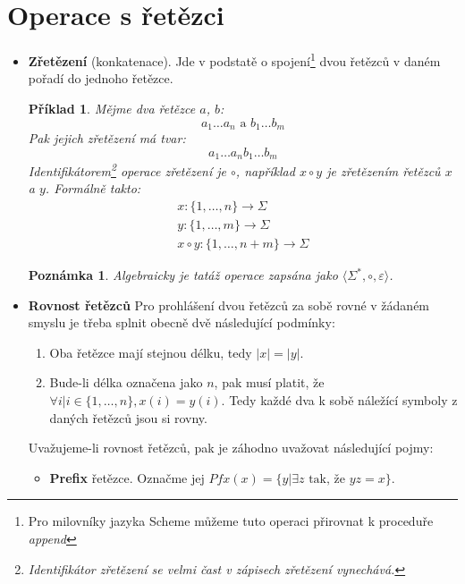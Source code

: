 \documentclass[10pt, a4paper, titlepage]{article}
\theoremstyle{note}
\newtheorem{priklad}{Příklad}
\newtheorem{poznamka}{Poznámka}
\begin{document}
\section{Operace s řetězci}
\begin{itemize}
\item
\textbf{Zřetězení} (konkatenace). Jde v podstatě o spojení\footnote{Pro milovníky jazyka Scheme můžeme tuto operaci přirovnat k proceduře \emph{append}}
dvou řetězců v daném pořadí do jednoho řetězce.

\begin{priklad}
Mějme dva řetězce $a$, $b$:
$$
a_{1}\ldots a_{n} \text{ a } b_{1}\ldots b_{m}
$$
Pak jejich zřetězení má tvar:
$$
a_{1}\ldots a_{n}b_{1}\ldots b_{m}
$$
Identifikátorem\footnote{Identifikátor zřetězení se velmi čast v zápisech zřetězení vynechává.} operace
zřetězení je $\circ$, například $x\circ y$ je zřetězením řetězců $x$ a $y$.
Formálně takto:
\begin{gather*}
x : \lbrace 1,\ldots, n \rbrace \rightarrow \Sigma \\
y : \lbrace 1,\ldots, m \rbrace \rightarrow \Sigma \\
x \circ y : \lbrace 1,\ldots, n+m \rbrace \rightarrow \Sigma
\end{gather*}
\end{priklad}

\begin{poznamka}
Algebraicky je tatáž operace zapsána jako $\langle \Sigma^{*}, \circ, \varepsilon \rangle$.
\end{poznamka}

\item
\textbf{Rovnost řetězců}
Pro prohlášení dvou řetězců za sobě rovné v žádaném smyslu je třeba splnit obecně dvě následující podmínky:
\begin{enumerate}
\item
Oba řetězce mají stejnou délku, tedy $|x| = |y|$.

\item
Bude-li délka označena jako $n$, pak musí platit, že $\forall i | i \in \lbrace 1, \ldots, n \rbrace, x(i) = y(i)$.
Tedy každé dva k sobě náležící symboly z daných řetězců jsou si rovny.
\end{enumerate}
Uvažujeme-li rovnost řetězců, pak je záhodno uvažovat následující pojmy:
\begin{itemize}
\item
\textbf{Prefix} řetězce. Označme jej $Pfx(x) = \lbrace y | \exists z \text{ tak, že } yz = x \rbrace$.


\end{itemize}
\end{itemize}
\end{document}
